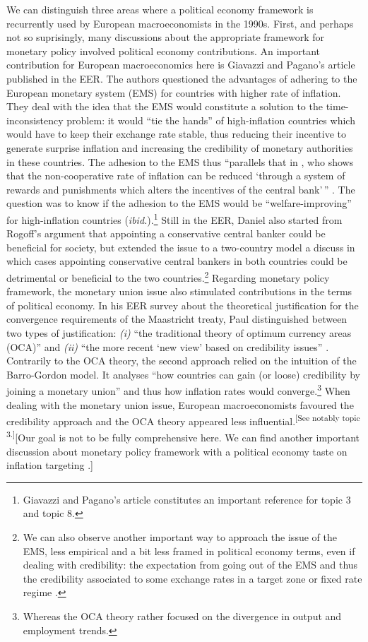 \documentclass[]{elsarticle} %
\begin{document}
We can distinguish three areas where a political economy framework is
recurrently used by European macroeconomists in the 1990s. First, and
perhaps not so suprisingly, many discussions about the appropriate
framework for monetary policy involved political economy contributions.
An important contribution for European macroeconomics here is Giavazzi
and Pagano's \citeyearpar{giavazzi1988} article published in the EER.
The authors questioned the advantages of adhering to the European
monetary system (EMS) for countries with higher rate of inflation. They
deal with the idea that the EMS would constitute a solution to the
time-inconsistency problem: it would ``tie the hands'' of high-inflation
countries which would have to keep their exchange rate stable, thus
reducing their incentive to generate surprise inflation and increasing
the credibility of monetary authorities in these countries. The adhesion
to the EMS thus ``parallels that in \citet{rogoff1985b}, who shows that
the non-cooperative rate of inflation can be reduced `through a system
of rewards and punishments which alters the incentives of the central
bank'\,'' \citep[1057]{giavazzi1988}. The question was to know if the
adhesion to the EMS would be ``welfare-improving'' for high-inflation
countries (\emph{ibid.}).\footnote{Giavazzi and Pagano's article
  constitutes an important reference for topic 3 and topic 8.} Still in
the EER, Daniel \citet{laskar1989} also started from Rogoff's
\citeyearpar{rogoff1985b} argument that appointing a conservative
central banker could be beneficial for society, but extended the issue
to a two-country model a discuss in which cases appointing conservative
central bankers in both countries could be detrimental or beneficial to
the two countries.\footnote{We can also observe another important way to
  approach the issue of the EMS, less empirical and a bit less framed in
  political economy terms, even if dealing with credibility: the
  expectation from going out of the EMS and thus the credibility
  associated to some exchange rates in a target zone or fixed rate
  regime \citep{svensson1993a, rose1994}.} Regarding monetary policy
framework, the monetary union issue also stimulated contributions in the
terms of political economy. In his EER survey about the theoretical
justification for the convergence requirements of the Maastricht treaty,
Paul distinguished between two types of justification: \emph{(i)} ``the
traditional theory of optimum currency areas (OCA)'' and \emph{(ii)}
``the more recent `new view' based on credibility issues''
\citep[1091-1092]{degrauwe1996}. Contrarily to the OCA theory, the
second approach relied on the intuition of the Barro-Gordon model. It
analyses ``how countries can gain (or loose) credibility by joining a
monetary union'' and thus how inflation rates would converge.\footnote{Whereas
  the OCA theory rather focused on the divergence in output and
  employment trends.} When dealing with the monetary union issue,
European macroeconomists favoured the credibility approach and the OCA
theory appeared less influential.\textsuperscript{{[}See notably topic
3.{]}}{[}Our goal is not to be fully comprehensive here. We can find
another important discussion about monetary policy framework with a
political economy taste on inflation targeting \citep[see
notably][]{svensson1997}.{]}
\end{document}
